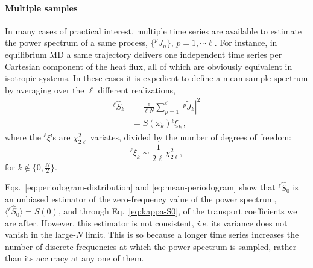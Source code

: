 \paragraph{Multiple samples}
In many cases of practical interest, multiple time series are available to estimate the power spectrum of a same process, $\{^{p\!}J_n\}$, $p=1, \cdots \ell$. For instance, in equilibrium MD a same trajectory delivers one independent time series per Cartesian component of the heat flux, all of which are obviously equivalent in isotropic systems. In these cases it is expedient to define a mean sample spectrum by averaging over the $\ell$ different realizations,
\begin{equation}
    \begin{aligned}
      {^{\ell\!}\hat{S}}_{k}& = \frac{\epsilon}{\ell N} \sum_{p=1}^{\ell}  \left |{^p\!}{\tilde J}_{k} \right |^2 \\
      & = S(\omega_k) {^{\ell\!}{\xi}_{k}} \,,
    \end{aligned}  \label{eq:mean-periodogram}
\end{equation}
where the ${^{\ell\!}\xi}$'s are $\chi_{2\ell}^2$ variates, divided by the number of degrees of freedom:
\begin{equation}
    ^{\ell\!}\xi_{k}\sim\frac{1}{2\ell}\chi_{2\ell}^{2}, \label{eq:chi-square-nu}
\end{equation}
for $k \notin \{ 0,\frac{N}{2} \}$. 

Eqs.~\eqref{eq:periodogram-distribution} and \eqref{eq:mean-periodogram} show that ${^{\ell\!}}{\hat S_0}$ is an unbiased estimator of the zero-frequency value of the power spectrum, $\langle {^{\ell\!}}{\hat S_0} \rangle = S(0)$, and through Eq.~\eqref{eq:kappa-S0}, of the transport coefficients we are after.
However, this estimator is not consistent, \emph{i.e.} its variance does not vanish in the large-$N$ limit. This is so because a longer time series increases the number of discrete frequencies at which the power spectrum is sampled, rather than its accuracy at any one of them.

